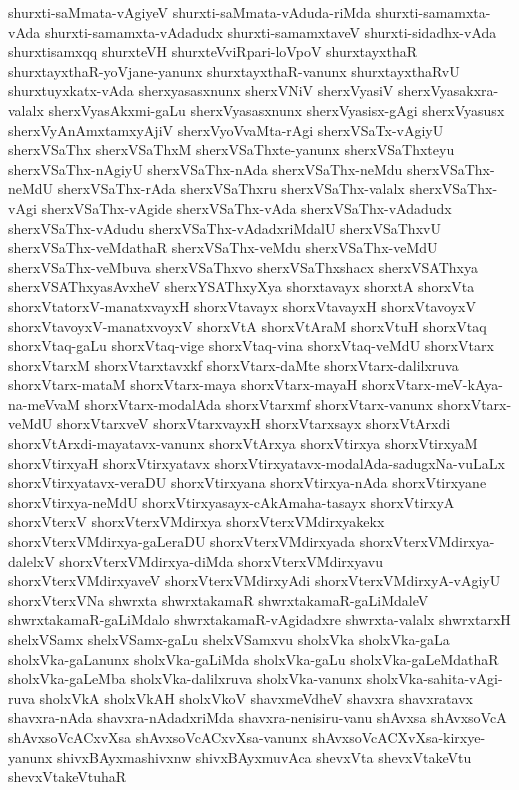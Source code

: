 {shurxti-saMmata-vAgiyeV
shurxti-saMmata-vAduda-riMda
shurxti-samamxta-vAda
shurxti-samamxta-vAdadudx
shurxti-samamxtaveV
shurxti-sidadhx-vAda
shurxtisamxqq
shurxteVH
shurxteVviRpari-loVpoV
shurxtayxthaR
shurxtayxthaR-yoVjane-yanunx
shurxtayxthaR-vanunx
shurxtayxthaRvU
shurxtuyxkatx-vAda
sherxyasasxnunx
sherxVNiV
sherxVyasiV
sherxVyasakxra-valalx
sherxVyasAkxmi-gaLu
sherxVyasasxnunx
sherxVyasisx-gAgi
sherxVyasusx
sherxVyAnAmxtamxyAjiV
sherxVyoVvaMta-rAgi
sherxVSaTx-vAgiyU
sherxVSaThx
sherxVSaThxM
sherxVSaThxte-yanunx
sherxVSaThxteyu
sherxVSaThx-nAgiyU
sherxVSaThx-nAda
sherxVSaThx-neMdu
sherxVSaThx-neMdU
sherxVSaThx-rAda
sherxVSaThxru
sherxVSaThx-valalx
sherxVSaThx-vAgi
sherxVSaThx-vAgide
sherxVSaThx-vAda
sherxVSaThx-vAdadudx
sherxVSaThx-vAdudu
sherxVSaThx-vAdadxriMdalU
sherxVSaThxvU
sherxVSaThx-veMdathaR
sherxVSaThx-veMdu
sherxVSaThx-veMdU
sherxVSaThx-veMbuva
sherxVSaThxvo
sherxVSaThxshacx
sherxVSAThxya
sherxVSAThxyasAvxheV
sherxYSAThxyXya
shorxtavayx
shorxtA
shorxVta
shorxVtatorxV-manatxvayxH
shorxVtavayx
shorxVtavayxH
shorxVtavoyxV
shorxVtavoyxV-manatxvoyxV
shorxVtA
shorxVtAraM
shorxVtuH
shorxVtaq
shorxVtaq-gaLu
shorxVtaq-vige
shorxVtaq-vina
shorxVtaq-veMdU
shorxVtarx
shorxVtarxM
shorxVtarxtavxkf
shorxVtarx-daMte
shorxVtarx-dalilxruva
shorxVtarx-mataM
shorxVtarx-maya
shorxVtarx-mayaH
shorxVtarx-meV-kAya-na-meVvaM
shorxVtarx-modalAda
shorxVtarxmf
shorxVtarx-vanunx
shorxVtarx-veMdU
shorxVtarxveV
shorxVtarxvayxH
shorxVtarxsayx
shorxVtArxdi
shorxVtArxdi-mayatavx-vanunx
shorxVtArxya
shorxVtirxya
shorxVtirxyaM
shorxVtirxyaH
shorxVtirxyatavx
shorxVtirxyatavx-modalAda-sadugxNa-vuLaLx
shorxVtirxyatavx-veraDU
shorxVtirxyana
shorxVtirxya-nAda
shorxVtirxyane
shorxVtirxya-neMdU
shorxVtirxyasayx-cAkAmaha-tasayx
shorxVtirxyA
shorxVterxV
shorxVterxVMdirxya
shorxVterxVMdirxyakekx
shorxVterxVMdirxya-gaLeraDU
shorxVterxVMdirxyada
shorxVterxVMdirxya-dalelxV
shorxVterxVMdirxya-diMda
shorxVterxVMdirxyavu
shorxVterxVMdirxyaveV
shorxVterxVMdirxyAdi
shorxVterxVMdirxyA-vAgiyU
shorxVterxVNa
shwrxta
shwrxtakamaR
shwrxtakamaR-gaLiMdaleV
shwrxtakamaR-gaLiMdalo
shwrxtakamaR-vAgidadxre
shwrxta-valalx
shwrxtarxH
shelxVSamx
shelxVSamx-gaLu
shelxVSamxvu
sholxVka
sholxVka-gaLa
sholxVka-gaLanunx
sholxVka-gaLiMda
sholxVka-gaLu
sholxVka-gaLeMdathaR
sholxVka-gaLeMba
sholxVka-dalilxruva
sholxVka-vanunx
sholxVka-sahita-vAgi-ruva
sholxVkA
sholxVkAH
sholxVkoV
shavxmeVdheV
shavxra
shavxratavx
shavxra-nAda
shavxra-nAdadxriMda
shavxra-nenisiru-vanu
shAvxsa
shAvxsoVcA
shAvxsoVcACxvXsa
shAvxsoVcACxvXsa-vanunx
shAvxsoVcACXvXsa-kirxye-yanunx
shivxBAyxmashivxnw
shivxBAyxmuvAca
shevxVta
shevxVtakeVtu
shevxVtakeVtuhaR
}
